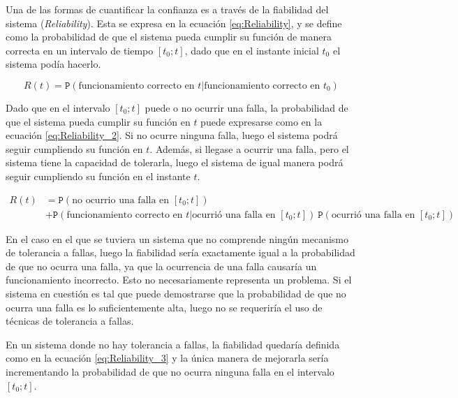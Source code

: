 Una de las formas de cuantificar la confianza es a través de la fiabilidad del sistema (\textit{Reliability}). Esta se expresa en la ecuación \eqref{eq:Reliability}, y se define como la probabilidad de que el sistema pueda cumplir su función de manera correcta en un intervalo de tiempo $[t_0;t]$, dado que en el instante inicial $t_0$ el sistema podía hacerlo.

\begin{equation}
    R(t) = \mathtt{P}\left( \text{funcionamiento correcto en $t$} | \text{funcionamiento correcto en $t_0$} \right)
    \label{eq:Reliability}
\end{equation}

Dado que en el intervalo $[t_0;t]$ puede o no ocurrir una falla, la probabilidad de que el sistema pueda cumplir su función en $t$ puede expresarse como en la ecuación \eqref{eq:Reliability_2}. Si no ocurre ninguna falla, luego el sistema podrá seguir cumpliendo su función en $t$. Además, si llegase a ocurrir una falla, pero el sistema tiene la capacidad de tolerarla, luego el sistema de igual manera podrá seguir cumpliendo su función en el instante $t$.

\begin{equation}
    \begin{aligned}
        R(t) &= \mathtt{P}\left( \text{no ocurrio una falla en $[t_0;t]$} \right)\\ &+ \mathtt{P}\left( \text{funcionamiento correcto en $t$}|\text{ocurrió una falla en $[t_0;t]$} \right) \ \mathtt{P}\left( \text{ocurrió una falla en $[t_0;t]$} \right)
    \end{aligned}
    \label{eq:Reliability_2}
\end{equation}

En el caso en el que se tuviera un sistema que no comprende ningún mecanismo de tolerancia a fallas, luego la fiabilidad sería exactamente igual a la probabilidad de que no ocurra una falla, ya que la ocurrencia de una falla causaría un funcionamiento incorrecto. Esto no necesariamente representa un problema. Si el sistema en cuestión es tal que puede demostrarse que la probabilidad de que no ocurra una falla es lo suficientemente alta, luego no se requeriría el uso de técnicas de tolerancia a fallas.

En un sistema donde no hay tolerancia a fallas, la fiabilidad quedaría definida como en la ecuación \eqref{eq:Reliability_3} y la única manera de mejorarla sería incrementando la probabilidad de que no ocurra ninguna falla en el intervalo $[t_0;t]$.

